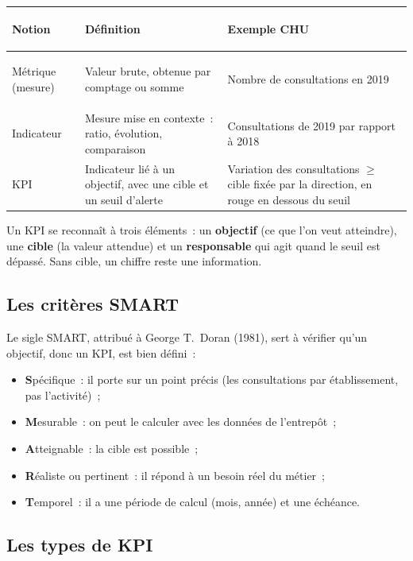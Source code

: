 \begin{center}
\small
\begin{tabularx}{\textwidth}{>{\bfseries\raggedright\arraybackslash}p{2.4cm} >{\raggedright\arraybackslash}X >{\raggedright\arraybackslash}X}
\toprule
Notion & Définition & Exemple CHU \\
\midrule
Métrique (mesure) & Valeur brute, obtenue par comptage ou somme & Nombre de consultations en 2019 \\
Indicateur & Mesure mise en contexte~: ratio, évolution, comparaison & Consultations de 2019 par rapport à 2018 \\
KPI & Indicateur lié à un objectif, avec une cible et un seuil d'alerte & Variation des consultations $\geq$ cible fixée par la direction, en rouge en dessous du seuil \\
\bottomrule
\end{tabularx}
\end{center}

\noindent Un KPI se reconnaît à trois éléments~: un \textbf{objectif} (ce que l'on veut atteindre), une \textbf{cible} (la valeur attendue) et un \textbf{responsable} qui agit quand le seuil est dépassé. Sans cible, un chiffre reste une information.

\subsection{Les critères SMART}

\noindent Le sigle SMART, attribué à George T.~Doran (1981), sert à vérifier qu'un objectif, donc un KPI, est bien défini~:
\begin{itemize}
	\item \textbf{S}pécifique~: il porte sur un point précis (les consultations par établissement, pas \og l'activité\fg{})~;
	\item \textbf{M}esurable~: on peut le calculer avec les données de l'entrepôt~;
	\item \textbf{A}tteignable~: la cible est possible~;
	\item \textbf{R}éaliste ou pertinent~: il répond à un besoin réel du métier~;
	\item \textbf{T}emporel~: il a une période de calcul (mois, année) et une échéance.
\end{itemize}

\subsection{Les types de KPI}

